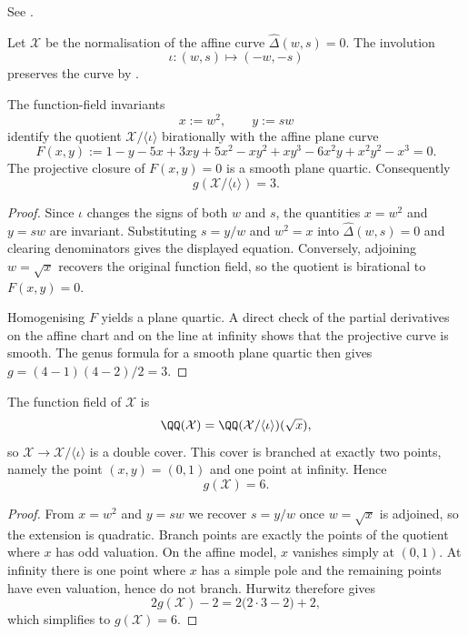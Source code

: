 \begin{proposition}
  \label{prop:sync-hatdelta-completion}
  See \cite[Proposition~3.3]{MaZhang2026SelfDualKernel}.
\end{proposition}

Let $\mathcal X$ be the normalisation of the affine curve
$\widehat\Delta(w,s)=0$. The involution
\[
  \iota:(w,s)\longmapsto(-w,-s)
\]
preserves the curve by .

\begin{proposition}
  \label{prop:sync-hatdelta-quotient}
  The function-field invariants
  \[
    x:=w^2,\qquad y:=sw
  \]
  identify the quotient $\mathcal X/\langle\iota\rangle$ birationally
  with the affine plane curve
  \[
    F(x,y):=
    1-y-5x+3xy+5x^2-xy^2+xy^3-6x^2y+x^2y^2-x^3=0.
  \]
  The projective closure of $F(x,y)=0$ is a smooth plane quartic.
  Consequently
  \[
    g(\mathcal X/\langle\iota\rangle)=3.
  \]
\end{proposition}

\begin{proof}
  Since $\iota$ changes the signs of both $w$ and $s$, the quantities
  $x=w^2$ and $y=sw$ are invariant. Substituting $s=y/w$ and
  $w^2=x$ into $\widehat\Delta(w,s)=0$ and clearing denominators gives
  the displayed equation. Conversely, adjoining $w=\sqrt{x}$ recovers
  the original function field, so the quotient is birational to
  $F(x,y)=0$.

  Homogenising $F$ yields a plane quartic. A direct check of the
  partial derivatives on the affine chart and on the line at infinity
  shows that the projective curve is smooth. The genus formula for a
  smooth plane quartic then gives $g=(4-1)(4-2)/2=3$.
\end{proof}

\begin{proposition}
  \label{prop:sync-hatdelta-double-cover}
  The function field of $\mathcal X$ is
  \[
    \QQ(\mathcal X)=\QQ(\mathcal X/\langle\iota\rangle)(\sqrt{x}),
  \]
  so $\mathcal X\to\mathcal X/\langle\iota\rangle$ is a double cover.
  This cover is branched at exactly two points, namely the point
  $(x,y)=(0,1)$ and one point at infinity. Hence
  \[
    g(\mathcal X)=6.
  \]
\end{proposition}

\begin{proof}
  From $x=w^2$ and $y=sw$ we recover $s=y/w$ once $w=\sqrt{x}$ is
  adjoined, so the extension is quadratic. Branch points are exactly
  the points of the quotient where $x$ has odd valuation. On the affine
  model, $x$ vanishes simply at $(0,1)$. At infinity there is one point
  where $x$ has a simple pole and the remaining points have even
  valuation, hence do not branch. Hurwitz therefore gives
  \[
    2g(\mathcal X)-2
    =2\bigl(2\cdot 3-2\bigr)+2,
  \]
  which simplifies to $g(\mathcal X)=6$.
\end{proof}

